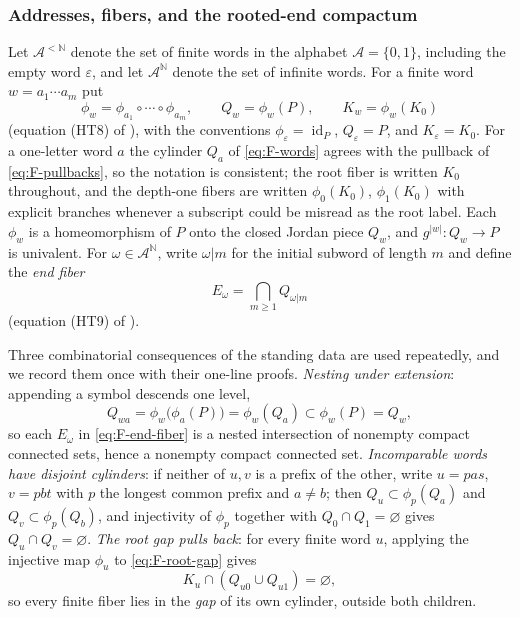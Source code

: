 \documentclass[11pt,reqno]{amsart}
\theoremstyle{definition}
\theoremstyle{remark}
\newcommand{\id}{\operatorname{id}}
\begin{document}
\subsubsection*{Addresses, fibers, and the rooted-end compactum}
Let $\mathcal A^{<\mathbb N}$ denote the set of finite words in the
alphabet $\mathcal A=\{0,1\}$, including the empty word $\varepsilon$, and
let $\mathcal A^{\mathbb N}$ denote the set of infinite words.  For a
finite word $w=a_1\cdots a_m$ put
\begin{equation}\label{eq:F-words}
\phi_w=\phi_{a_1}\circ\cdots\circ\phi_{a_m},
\qquad
Q_w=\phi_w(P),
\qquad
K_w=\phi_w(K_0)
\end{equation}
(equation (HT8) of \cite{MWman}), with the conventions
$\phi_\varepsilon=\id_P$, $Q_\varepsilon=P$, and
$K_\varepsilon=K_0$.  For a one-letter word $a$ the cylinder $Q_a$ of
\eqref{eq:F-words} agrees with the pullback of \eqref{eq:F-pullbacks}, so
the notation is consistent; the root fiber is written $K_0$ throughout,
and the depth-one fibers are written $\phi_0(K_0)$, $\phi_1(K_0)$ with
explicit branches whenever a subscript could be misread as the root
label.  Each $\phi_w$ is a homeomorphism of $P$ onto the closed Jordan
piece $Q_w$, and $g^{|w|}\colon Q_w\to P$ is univalent.  For
$\omega\in\mathcal A^{\mathbb N}$, write $\omega|m$ for the initial
subword of length $m$ and define the \emph{end fiber}
\begin{equation}\label{eq:F-end-fiber}
E_\omega=\bigcap_{m\ge1}Q_{\omega|m}
\end{equation}
(equation (HT9) of \cite{MWman}).

Three combinatorial consequences of the standing data are used
repeatedly, and we record them once with their one-line proofs.
\emph{Nesting under extension}: appending a symbol descends one level,
\[
Q_{wa}=\phi_w\bigl(\phi_a(P)\bigr)=\phi_w(Q_a)\subset\phi_w(P)=Q_w ,
\]
so each $E_\omega$ in \eqref{eq:F-end-fiber} is a nested intersection of
nonempty compact connected sets, hence a nonempty compact connected set.
\emph{Incomparable words have disjoint cylinders}: if neither of $u,v$ is
a prefix of the other, write $u=pas$, $v=pbt$ with $p$ the longest common
prefix and $a\ne b$; then $Q_u\subset\phi_p(Q_a)$ and
$Q_v\subset\phi_p(Q_b)$, and injectivity of $\phi_p$ together with
$Q_0\cap Q_1=\varnothing$ gives $Q_u\cap Q_v=\varnothing$.
\emph{The root gap pulls back}: for every finite word $u$, applying the
injective map $\phi_u$ to \eqref{eq:F-root-gap} gives
\begin{equation}\label{eq:F-root-gap-pullback}
K_u\cap(Q_{u0}\cup Q_{u1})=\varnothing ,
\end{equation}
so every finite fiber lies in the \emph{gap} of its own cylinder, outside
both children.
\end{document}
